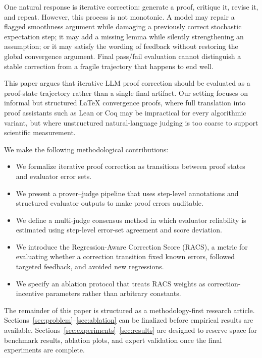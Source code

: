 \documentclass[conference]{IEEEtran}
\begin{document}
One natural response is iterative correction: generate a proof, critique it, revise it, and repeat. However, this process is not monotonic. A model may repair a flagged smoothness argument while damaging a previously correct stochastic expectation step; it may add a missing lemma while silently strengthening an assumption; or it may satisfy the wording of feedback without restoring the global convergence argument. Final pass/fail evaluation cannot distinguish a stable correction from a fragile trajectory that happens to end well.

This paper argues that iterative LLM proof correction should be evaluated as a proof-state trajectory rather than a single final artifact. Our setting focuses on informal but structured LaTeX convergence proofs, where full translation into proof assistants such as Lean or Coq may be impractical for every algorithmic variant, but where unstructured natural-language judging is too coarse to support scientific measurement.

We make the following methodological contributions:
\begin{itemize}
    \item We formalize iterative proof correction as transitions between proof states and evaluator error sets.
    \item We present a prover--judge pipeline that uses step-level annotations and structured evaluator outputs to make proof errors auditable.
    \item We define a multi-judge consensus method in which evaluator reliability is estimated using step-level error-set agreement and score deviation.
    \item We introduce the Regression-Aware Correction Score (RACS), a metric for evaluating whether a correction transition fixed known errors, followed targeted feedback, and avoided new regressions.
    \item We specify an ablation protocol that treats RACS weights as correction-incentive parameters rather than arbitrary constants.
\end{itemize}

The remainder of this paper is structured as a methodology-first research article. Sections~\ref{sec:problem}--\ref{sec:ablation} can be finalized before empirical results are available. Sections~\ref{sec:experiments}--\ref{sec:results} are designed to reserve space for benchmark results, ablation plots, and expert validation once the final experiments are complete.
\end{document}
